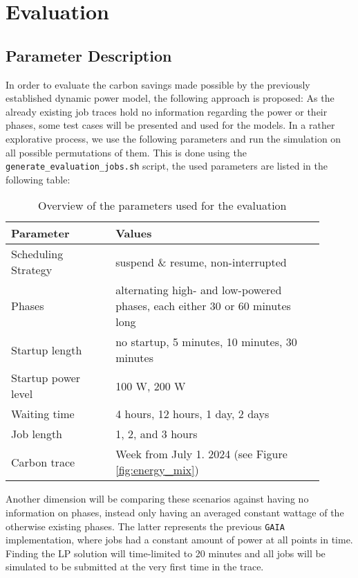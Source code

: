 \chapter{Evaluation} \label{sec:evaluate_scheduling}

\section{Parameter Description}

In order to evaluate the carbon savings made possible by the previously established dynamic power model, the following approach is proposed:
As the already existing job traces hold no information regarding the power or their phases, some test cases will be presented and used for the models.
In a rather explorative process, we use the following parameters and run the simulation on all possible permutations of them. 
This is done using the \verb|generate_evaluation_jobs.sh| script, the used parameters are listed in the following table:

\begin{table}[h!]
    \centering
    \begin{tabular}{|p{0.3\linewidth}|p{0.6\linewidth}|}
    \hline
        Parameter & Values \\ \hline
        Scheduling Strategy & suspend \& resume, non-interrupted \\ \hline
        Phases & alternating high- and low-powered phases, each either 30 or 60 minutes long \\ \hline
        Startup length & no startup, 5 minutes, 10 minutes, 30 minutes \\ \hline
        Startup power level & 100 W, 200 W \\ \hline
        Waiting time & 4 hours, 12 hours, 1 day, 2 days \\ \hline
        Job length & 1, 2, and 3 hours \\ \hline
        Carbon trace & Week from July 1. 2024 (see Figure \ref{fig:energy_mix}) \\ \hline
    \end{tabular}
    \caption{Overview of the parameters used for the evaluation}
    \label{tab:evaluation_parameters}
    \end{table}

Another dimension will be comparing these scenarios against having no information on phases, instead only having an averaged constant wattage of the otherwise existing phases.
The latter represents the previous \verb|GAIA| implementation, where jobs had a constant amount of power at all points in time.
Finding the LP solution will time-limited to 20 minutes and all jobs will be simulated to be submitted at the very first time in the trace.

